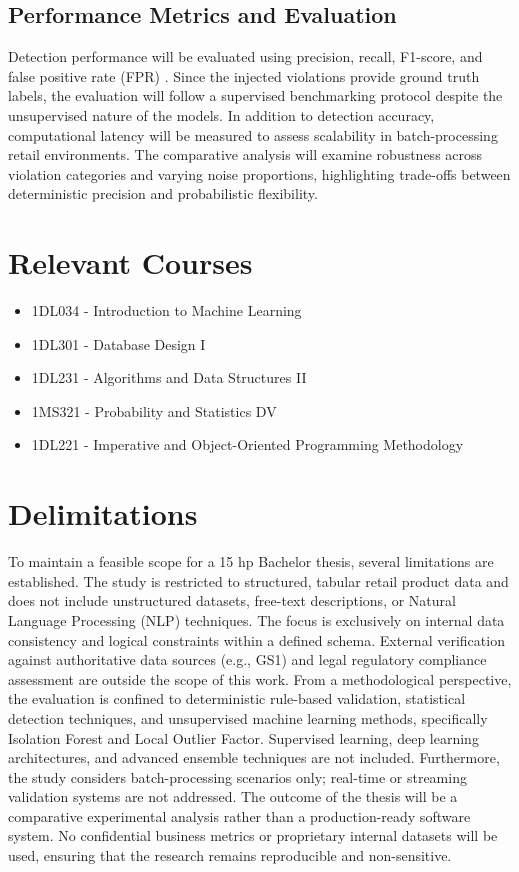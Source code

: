 \documentclass[a4paper, 12pt]{article} %
\begin{document}
\subsection{Performance Metrics and Evaluation}
Detection performance will be evaluated using precision, recall, F1-score, and false positive rate (FPR) \cite{chandola2009anomaly}. Since the injected violations provide ground truth labels, the evaluation will follow a supervised benchmarking protocol despite the unsupervised nature of the models.
In addition to detection accuracy, computational latency will be measured to assess scalability in batch-processing retail environments. The comparative analysis will examine robustness across violation categories and varying noise proportions, highlighting trade-offs between deterministic precision and probabilistic flexibility.
\section{Relevant Courses}
\begin{itemize}
    \item 1DL034 - Introduction to Machine Learning
    \item 1DL301 - Database Design I
    \item 1DL231 - Algorithms and Data Structures II
    \item 1MS321 - Probability and Statistics DV
    \item 1DL221 - Imperative and Object-Oriented Programming Methodology
\end{itemize}
\section{Delimitations}
To maintain a feasible scope for a 15 hp Bachelor thesis, several limitations are established.
The study is restricted to structured, tabular retail product data and does not include unstructured datasets, free-text descriptions, or Natural Language Processing (NLP) techniques. The focus is exclusively on internal data consistency and logical constraints within a defined schema. External verification against authoritative data sources (e.g., GS1) and legal regulatory compliance assessment are outside the scope of this work.
From a methodological perspective, the evaluation is confined to deterministic rule-based validation, statistical detection techniques, and unsupervised machine learning methods, specifically Isolation Forest and Local Outlier Factor. Supervised learning, deep learning architectures, and advanced ensemble techniques are not included. Furthermore, the study considers batch-processing scenarios only; real-time or streaming validation systems are not addressed.
The outcome of the thesis will be a comparative experimental analysis rather than a production-ready software system. No confidential business metrics or proprietary internal datasets will be used, ensuring that the research remains reproducible and non-sensitive.
\end{document}
